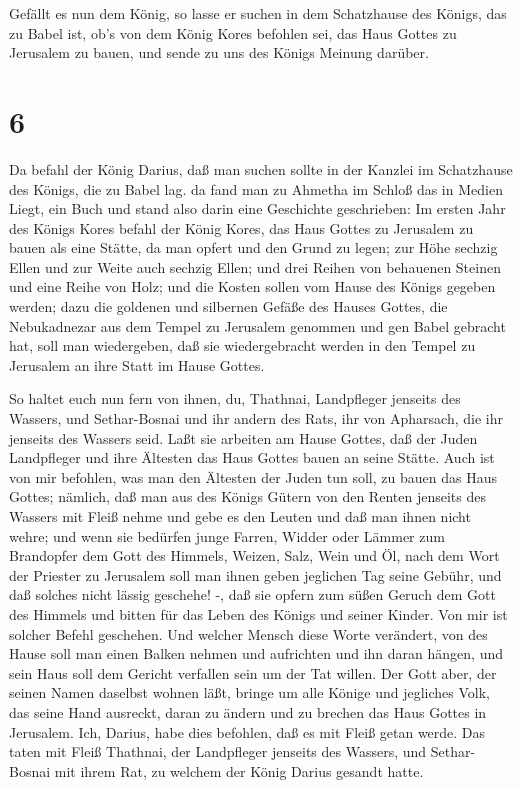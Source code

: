  Gefällt es nun dem König, so lasse er suchen in dem
Schatzhause des Königs, das zu Babel ist, ob's von dem König Kores
befohlen sei, das Haus Gottes zu Jerusalem zu bauen, und sende zu uns
des Königs Meinung darüber.

\hypertarget{section-5}{%
\section{6}\label{section-5}}

 Da befahl der König Darius, daß man suchen sollte in der
Kanzlei im Schatzhause des Königs, die zu Babel lag.  da
fand man zu Ahmetha im Schloß das in Medien Liegt, ein Buch und stand
also darin eine Geschichte geschrieben:  Im ersten Jahr des
Königs Kores befahl der König Kores, das Haus Gottes zu Jerusalem zu
bauen als eine Stätte, da man opfert und den Grund zu legen; zur Höhe
sechzig Ellen und zur Weite auch sechzig Ellen;  und drei
Reihen von behauenen Steinen und eine Reihe von Holz; und die Kosten
sollen vom Hause des Königs gegeben werden;  dazu die
goldenen und silbernen Gefäße des Hauses Gottes, die Nebukadnezar aus
dem Tempel zu Jerusalem genommen und gen Babel gebracht hat, soll man
wiedergeben, daß sie wiedergebracht werden in den Tempel zu Jerusalem an
ihre Statt im Hause Gottes.

 So haltet euch nun fern von ihnen, du, Thathnai,
Landpfleger jenseits des Wassers, und Sethar-Bosnai und ihr andern des
Rats, ihr von Apharsach, die ihr jenseits des Wassers seid. 
Laßt sie arbeiten am Hause Gottes, daß der Juden Landpfleger und ihre
Ältesten das Haus Gottes bauen an seine Stätte.  Auch ist
von mir befohlen, was man den Ältesten der Juden tun soll, zu bauen das
Haus Gottes; nämlich, daß man aus des Königs Gütern von den Renten
jenseits des Wassers mit Fleiß nehme und gebe es den Leuten und daß man
ihnen nicht wehre;  und wenn sie bedürfen junge Farren,
Widder oder Lämmer zum Brandopfer dem Gott des Himmels, Weizen, Salz,
Wein und Öl, nach dem Wort der Priester zu Jerusalem soll man ihnen
geben jeglichen Tag seine Gebühr, und daß solches nicht lässig geschehe!
-,  daß sie opfern zum süßen Geruch dem Gott des Himmels
und bitten für das Leben des Königs und seiner Kinder.  Von
mir ist solcher Befehl geschehen. Und welcher Mensch diese Worte
verändert, von des Hause soll man einen Balken nehmen und aufrichten und
ihn daran hängen, und sein Haus soll dem Gericht verfallen sein um der
Tat willen.  Der Gott aber, der seinen Namen daselbst
wohnen läßt, bringe um alle Könige und jegliches Volk, das seine Hand
ausreckt, daran zu ändern und zu brechen das Haus Gottes in Jerusalem.
Ich, Darius, habe dies befohlen, daß es mit Fleiß getan werde.
 Das taten mit Fleiß Thathnai, der Landpfleger jenseits des
Wassers, und Sethar-Bosnai mit ihrem Rat, zu welchem der König Darius
gesandt hatte.

